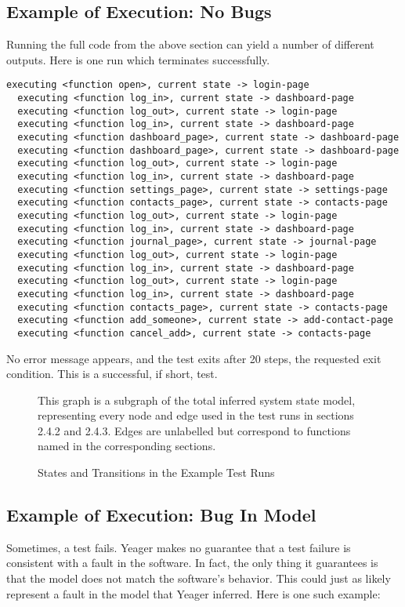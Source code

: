 \subsection{Example of Execution: No Bugs}
Running the full code from the above section can yield a number of different outputs. Here is one run which terminates successfully.

\begin{Verbatim}[fontsize=\small, baselinestretch=0.75]
  executing <function open>, current state -> login-page
  executing <function log_in>, current state -> dashboard-page
  executing <function log_out>, current state -> login-page
  executing <function log_in>, current state -> dashboard-page
  executing <function dashboard_page>, current state -> dashboard-page
  executing <function dashboard_page>, current state -> dashboard-page
  executing <function log_out>, current state -> login-page
  executing <function log_in>, current state -> dashboard-page
  executing <function settings_page>, current state -> settings-page
  executing <function contacts_page>, current state -> contacts-page
  executing <function log_out>, current state -> login-page
  executing <function log_in>, current state -> dashboard-page
  executing <function journal_page>, current state -> journal-page
  executing <function log_out>, current state -> login-page
  executing <function log_in>, current state -> dashboard-page
  executing <function log_out>, current state -> login-page
  executing <function log_in>, current state -> dashboard-page
  executing <function contacts_page>, current state -> contacts-page
  executing <function add_someone>, current state -> add-contact-page
  executing <function cancel_add>, current state -> contacts-page
\end{Verbatim}

No error message appears, and the test exits after 20 steps, the requested exit condition. This is a successful, if short, test.

\begin{figure}
\noindent{}
\caption{States and Transitions in the Example Test Runs}
This graph is a subgraph of the total inferred system state model, representing every node and edge used in the test runs in sections 2.4.2 and 2.4.3. Edges are unlabelled but correspond to functions named in the corresponding sections.
\end{figure}


\subsection{Example of Execution: Bug In Model}
Sometimes, a test fails. Yeager makes no guarantee that a test failure is consistent with a fault in the software. In fact, the only thing it guarantees is that the model does not match the software's behavior. This could just as likely represent a fault in the model that Yeager inferred. Here is one such example:

